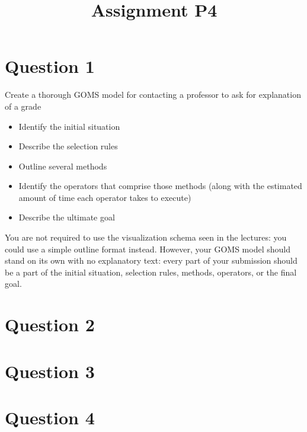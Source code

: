 

\title{Assignment P4\\}



\maketitle
\thispagestyle{fancy}

\section{Question 1}

Create a thorough GOMS model for contacting a professor to ask for explanation of a grade

\begin{itemize}
\item
  Identify the initial situation
\item
  Describe the selection rules
\item
  Outline several methods
\item
  Identify the operators that comprise those methods (along with the estimated amount of time each operator takes to execute)
\item
  Describe the ultimate goal
\end{itemize}

You are not required to use the visualization schema seen in the lectures: you could use a simple outline format instead. However, your GOMS model should stand on its own with no explanatory text: every part of your submission should be a part of the initial situation, selection rules, methods, operators, or the final goal.

\section{Question 2}

\section{Question 3}

\section{Question 4}


